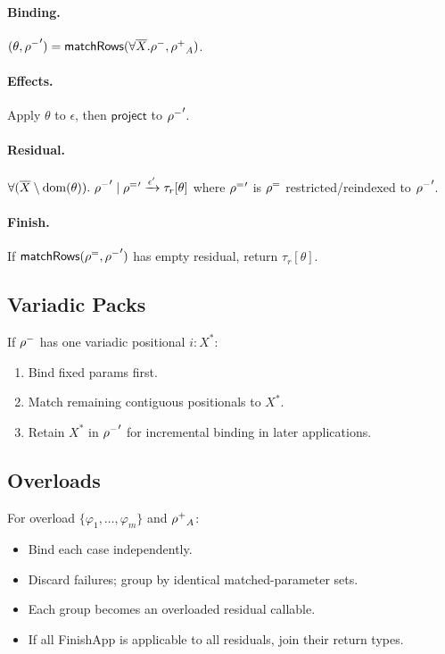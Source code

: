 \paragraph{Binding.}
$(\theta, \mathord{\rho^{-}}') = \mathsf{matchRows}(\forall\overline{X}.\mathord{\rho^{-}},\mathord{\rho^{+}}_A)$.

\paragraph{Effects.}
Apply $\theta$ to $\epsilon$, then $\mathsf{project}$ to $\mathord{\rho^{-}}'$.

\paragraph{Residual.} $\forall(\overline{X} \setminus \mathrm{dom}(\theta)).~\mathord{\rho^{-}}' \mid \mathord{\rho^{=}}' \xrightarrow{\epsilon'} \tau_r[\theta]$
where $\mathord{\rho^{=}}'$ is $\mathord{\rho^{=}}$ restricted/reindexed to $\mathord{\rho^{-}}'$.

\paragraph{Finish.}
If $\mathsf{matchRows}(\mathord{\rho^{=}},\mathord{\rho^{-}}')$ has empty residual, return $\tau_r[\theta]$.

\subsection{Variadic Packs}
If $\mathord{\rho^{-}}$ has one variadic positional $i:X^*$:
\begin{enumerate}
  \item Bind fixed params first.
  \item Match remaining contiguous positionals to $X^*$.
  \item Retain $X^*$ in $\mathord{\rho^{-}}'$ for incremental binding in later applications.
\end{enumerate}

\subsection{Overloads}
For overload $\{\varphi_1,\dots,\varphi_m\}$ and $\mathord{\rho^{+}}_A$:
\begin{itemize}
  \item Bind each case independently.
  \item Discard failures; group by identical matched-parameter sets.
  \item Each group becomes an overloaded residual callable.
  \item If all \textsf{FinishApp} is applicable to all residuals, join their return types.
\end{itemize}

